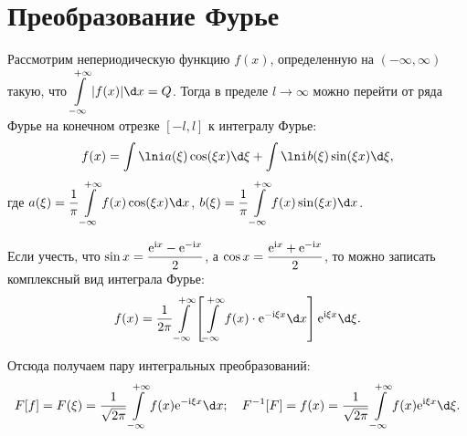 \section{Преобразование Фурье}
Рассмотрим непериодическую функцию \( f(x) \), определенную на \( (-\infty,
\infty) \) такую, что \( \ds \int\limits_{-\infty}^{+\infty} |f(x)|\d x = Q \).
Тогда в пределе \( l \to \infty \) можно перейти от ряда Фурье на конечном
отрезке \( [-l, l] \) к интегралу Фурье:
\[
    f(x) = \int\lni a(\xi)\cos(\xi x)\d\xi + \int\lni b(\xi)\sin(\xi x)\d\xi,
\]
где \( \ds a(\xi) = \frac{1}{\pi} \int\limits_{-\infty}^{+\infty}
f(x)\cos(\xi x)\d x \), \( \ds b(\xi) = \frac{1}{\pi}
\int\limits_{-\infty}^{+\infty} f(x)\sin(\xi x)\d x \).

Если учесть, что \( \displaystyle \sin x = \frac{\mathrm{e}^{\mathrm{i} x} - \mathrm{e}^{-\mathrm{i} x}}{2} \), а
\( \displaystyle \cos x = \frac{\mathrm{e}^{\mathrm{i} x} + \mathrm{e}^{-\mathrm{i} x}}{2} \), то можно записать
комплексный вид интеграла Фурье:
\[
    f(x) = \frac{1}{2\pi}\int\limits_{-\infty}^{+\infty} \left[
    \int\limits_{-\infty}^{+\infty} f(x)\cdot\e^{-\i\xi x}\d x\right]
    \e^{\i\xi x}\d\xi.
\]

Отсюда получаем пару интегральных преобразований:
\[
    F[f] = F(\xi) = \frac{1}{\sqrt{2\pi}}\int\limits_{-\infty}^{+\infty} f(x)
    \e^{-\i\xi x}\d x; \quad
    F^{-1}[F] = f(x) = \frac{1}{\sqrt{2\pi}}\int\limits_{-\infty}^{+\infty} f(x)
    \e^{\i\xi x}\d\xi.
\]
\newpage
